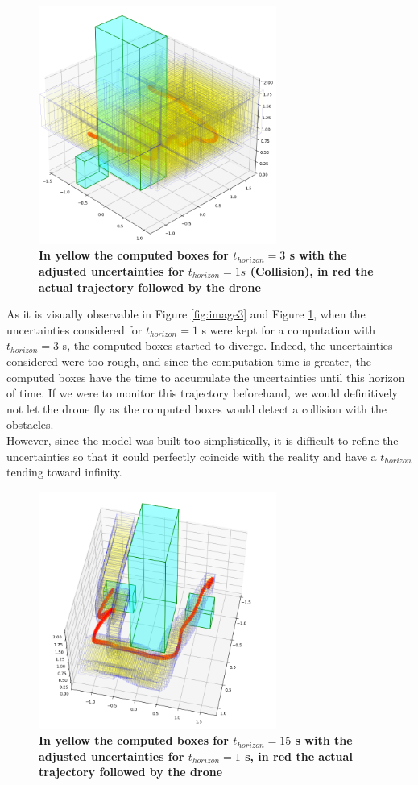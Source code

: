 \documentclass[letterpaper, 10 pt, conference]{ieeeconf}  %
\begin{document}
\begin{figure}[h!]
\centering
\includegraphics[width=7.8cm]{dynibex_3s.png}
\caption{ \textbf{In yellow the computed boxes for $t_{horizon} = 3 $ s with the adjusted uncertainties for $t_{horizon} = 1 s$  (Collision), in red the actual trajectory followed by the drone}}
\label{fig:image4}
\end{figure}
As it is visually observable in Figure \ref{fig:image3} and Figure \ref{fig:image4}, when the uncertainties considered for $t_{horizon} = 1 $ s were kept for a computation with $t_{horizon} = 3 $ s, the computed boxes started to diverge. Indeed, the uncertainties considered were too rough, and since the computation time is greater, the computed boxes have the time to accumulate the uncertainties until this horizon of time. If we were to monitor this trajectory beforehand, we would definitively not let the drone fly as the computed boxes would detect a collision with the obstacles.\\

However, since the model was built too simplistically, it is difficult to refine the uncertainties so that it could perfectly coincide with the reality and have a $t_{horizon}$ tending toward infinity. 

\begin{figure}[h!]
\centering
\includegraphics[width=7.8cm]{dynibex_15s.png}
\caption{ \textbf{In yellow the computed boxes for $t_{horizon} = 15$ s with the adjusted uncertainties for $t_{horizon} = 1$ s, in red the actual trajectory followed by the drone}}
\label{fig:dynibex_15s}
\end{figure}
\end{document}
